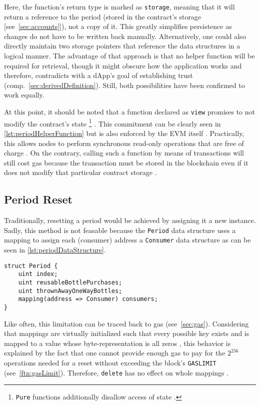 Here, the function's return type is marked as \texttt{storage}, meaning that it will return a reference to the period (stored in the contract's storage [see~\ref{sec:accounts}]), not a copy of it. This greatly simplifies persistence as changes do not have to be written back manually. Alternatively, one could also directly maintain two storage pointers that reference the data structures in a logical manner. The advantage of that approach is that no helper function will be required for retrieval, though it might obscure how the application works and therefore, contradicts with a \ac{dApp}'s goal of establishing trust (comp.~\ref{sec:derivedDefinition}). Still, both possibilities have been confirmed to work equally.
 
 At this point, it should be noted that a function declared as \texttt{view} promises to not modify the contract's state \footnote{\texttt{Pure} functions additionally disallow access of state \cite[p.~82]{solidityDocs}.} \cite[p.~82]{solidityDocs}. This commitment can be clearly seen in \autoref{lst:periodHelperFunction} but is also enforced by the \ac{EVM} itself \cite[p.~83]{solidityDocs}. Practically, this allows nodes to perform synchronous read-only operations that are free of charge \cite{transactionCall}. On the contrary, calling such a function by means of transactions will still cost gas because the transaction must be stored in the blockchain even if it does not modify that particular contract storage \cite{constantGas}. 
 
\subsection{Period Reset}
Traditionally, resetting a period would be achieved by assigning it a new instance. Sadly, this method is not feasable because the \texttt{Period} data structure uses a mapping to assign each (consumer) address a \texttt{Consumer} data structure as can be seen in \autoref{lst:periodDataStructure}. 

\begin{lstlisting}[language=Solidity, caption=Period data structure, label=lst:periodDataStructure]
struct Period {
	uint index;
	uint reusableBottlePurchases;
	uint thrownAwayOneWayBottles;
	mapping(address => Consumer) consumers;
}
\end{lstlisting}

Like often, this limitation can be traced back to gas (see~\ref{sec:gas}). Considering that mappings are virtually initialized such that every possible key exists and is mapped to a value whose byte-representation is all zeros \cite[p.~62]{solidityDocs}, this behavior is explained by the fact that one cannot provide enough gas to pay for the $2^{256}$ operations needed for a reset without exceeding the block's \texttt{GASLIMIT} (see~\autoref{ftn:gasLimit}). Therefore, \texttt{delete} has no effect on whole mappings \cite[p.~63]{solidityDocs}.

